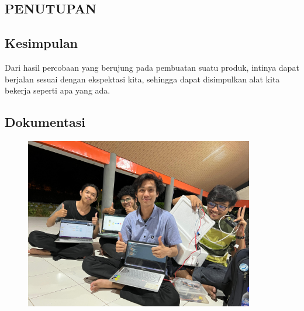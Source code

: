 \begin{center}
    \section*{PENUTUPAN}
\end{center}

\setcounter{section}{3}
\setcounter{subsection}{0}

    
\subsection{Kesimpulan}
    Dari hasil percobaan yang berujung pada pembuatan suatu produk, intinya dapat berjalan sesuai dengan ekspektasi kita, sehingga dapat disimpulkan alat kita bekerja seperti apa yang ada.

    
\subsection{Dokumentasi}
\begin{figure}[H]
     \centering
     \includegraphics[width=10cm]{image/desotmantapjiwa.jpg}
      \label{fig:Cover}
\end{figure}
